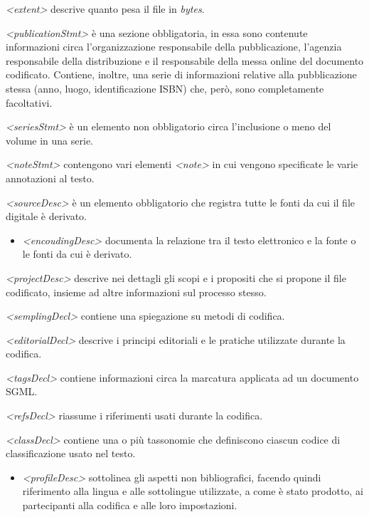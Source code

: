 \documentclass[
  b5paper,
  twoside,
  12pt,
  chapterprefix=false,
  bibliography=totocnumbered,
  parskip=false]{scrbook}
\providecommand{\tightlist}{%
  \setlength{\itemsep}{0pt}\setlength{\parskip}{0pt}}
\begin{document}
\emph{\textless extent\textgreater{}} descrive quanto pesa il file in \emph{bytes}.

\emph{\textless publicationStmt\textgreater{}} è una sezione obbligatoria, in essa sono contenute
informazioni circa l'organizzazione responsabile della pubblicazione,
l'agenzia responsabile della distribuzione e il responsabile della messa
online del documento codificato. Contiene, inoltre, una serie di
informazioni relative alla pubblicazione stessa (anno, luogo,
identificazione ISBN) che, però, sono completamente facoltativi.

\emph{\textless seriesStmt\textgreater{}} è un elemento non obbligatorio circa l'inclusione o
meno del volume in una serie.

\emph{\textless noteStmt\textgreater{}} contengono vari elementi \emph{\textless note\textgreater{}} in cui vengono
specificate le varie annotazioni al testo.

\emph{\textless sourceDesc\textgreater{}} è un elemento obbligatorio che registra tutte le fonti
da cui il file digitale è derivato.

\begin{itemize}
\tightlist
\item
  \emph{\textless encoudingDesc\textgreater{}} documenta la relazione tra il testo elettronico
  e la fonte o le fonti da cui è derivato.
\end{itemize}

\emph{\textless projectDesc\textgreater{}} descrive nei dettagli gli scopi e i propositi che si
propone il file codificato, insieme ad altre informazioni sul processo
stesso.

\emph{\textless semplingDecl\textgreater{}} contiene una spiegazione su metodi di codifica.

\emph{\textless editorialDecl\textgreater{}} descrive i principi editoriali e le pratiche
utilizzate durante la codifica.

\emph{\textless tagsDecl\textgreater{}} contiene informazioni circa la marcatura applicata ad un
documento SGML.

\emph{\textless refsDecl\textgreater{}} riassume i riferimenti usati durante la codifica.

\emph{\textless classDecl\textgreater{}} contiene una o più tassonomie che definiscono ciascun
codice di classificazione usato nel testo.

\begin{itemize}
\tightlist
\item
  \emph{\textless profileDesc\textgreater{}} sottolinea gli aspetti non bibliografici, facendo
  quindi riferimento alla lingua e alle sottolingue utilizzate, a come
  è stato prodotto, ai partecipanti alla codifica e alle loro
  impostazioni.
\end{itemize}
\end{document}
